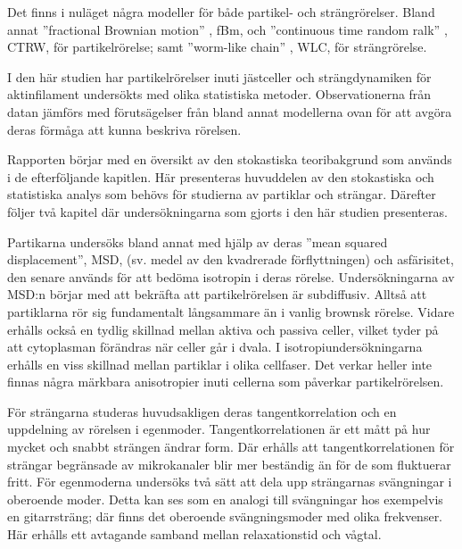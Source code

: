 Det finns i nuläget några modeller för både partikel- och strängrörelser. Bland annat ''fractional Brownian motion'' \cite{Mandelbrot_fBm1968}, fBm,
och ''continuous time random ralk'' \cite{Hofling&Franosch2013}, CTRW, 
 för partikelrörelse; 
samt ''worm-like chain'' \cite{Milstein2013}, WLC, 
 för strängrörelse. %

I den här studien har partikelrörelser inuti jästceller och strängdynamiken för aktinfilament undersökts med olika statistiska metoder. Observationerna från datan jämförs med förutsägelser från bland annat modellerna ovan för att avgöra deras förmåga att kunna beskriva rörelsen.

Rapporten börjar med en översikt av den stokastiska teoribakgrund som används i de efterföljande kapitlen. 
Här presenteras huvuddelen av den stokastiska och statistiska analys som behövs för studierna av partiklar och strängar. Därefter följer två kapitel där undersökningarna som gjorts i den här studien presenteras.

Partikarna undersöks bland annat med hjälp av deras ''mean squared displacement'', MSD, (sv. medel av den kvadrerade förflyttningen) och asfärisitet, den senare används för att bedöma isotropin i deras rörelse.
Undersökningarna av MSD:n börjar med att bekräfta att partikelrörelsen är subdiffusiv\cite{Hofling&Franosch2013}. Alltså att partiklarna rör sig fundamentalt långsammare än i vanlig brownsk rörelse. Vidare erhålls också en tydlig skillnad mellan aktiva och passiva celler, vilket tyder på att cytoplasman förändras när celler går i dvala. 
I isotropiundersökningarna erhålls en viss skillnad mellan partiklar i olika cellfaser. Det verkar heller inte finnas några märkbara anisotropier inuti cellerna som påverkar partikelrörelsen. 

För strängarna studeras huvudsakligen deras tangentkorrelation och en uppdelning av rörelsen i egenmoder. Tangentkorrelationen är ett mått på hur mycket och snabbt strängen ändrar form. Där erhålls att tangentkorrelationen för strängar begränsade av mikrokanaler blir mer beständig än för de som fluktuerar fritt. För egenmoderna undersöks två sätt att dela upp strängarnas svängningar i oberoende moder. Detta kan ses som en analogi till svängningar hos exempelvis en gitarrsträng; där finns det oberoende svängningsmoder med olika frekvenser. Här erhålls ett avtagande samband mellan relaxationstid och vågtal.

